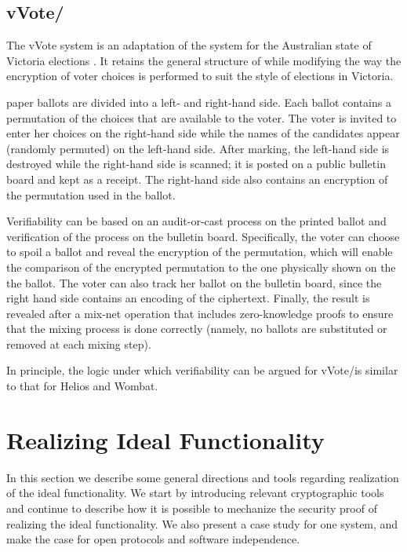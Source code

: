 \subsection{vVote/\PaV}

The vVote system is an adaptation of the \PaV system for the
Australian state of Victoria elections \cite{culnane2014vvote}. It
retains the general structure of \PaV \cite{ryan2009} while modifying
the way the encryption of voter choices is performed to suit the style
of elections in Victoria.

\PaV paper ballots are divided into a left- and right-hand side. Each
ballot contains a permutation of the choices that are available to the
voter. The voter is invited to enter her choices on the right-hand
side while the names of the candidates appear (randomly permuted) on
the left-hand side. After marking, the left-hand side is destroyed
while the right-hand side is scanned; it is posted on a public
bulletin board and kept as a receipt. The right-hand side also
contains an encryption of the permutation used in the ballot.

Verifiability can be based on an audit-or-cast process on the printed
ballot and verification of the process on the bulletin board.
Specifically, the voter can choose to spoil a ballot and reveal the
encryption of the permutation, which will enable the comparison of the
encrypted permutation to the one physically shown on the the ballot.
The voter can also track her ballot on the bulletin board, since the
right hand side contains an encoding of the ciphertext. Finally, the
result is revealed after a mix-net operation that includes
zero-knowledge proofs to ensure that the mixing process is done
correctly (namely, no ballots are substituted or removed at each
mixing step).

In principle, the logic under which verifiability can be argued for
vVote/\PaV is similar to that for Helios and Wombat.

\section{Realizing Ideal Functionality}

In this section we describe some general directions and tools
regarding realization of the ideal functionality. We start by
introducing relevant cryptographic tools and continue to describe how
it is possible to mechanize the security proof of realizing the ideal
functionality. We also present a case study for one system, and make
the case for open protocols and software independence.


